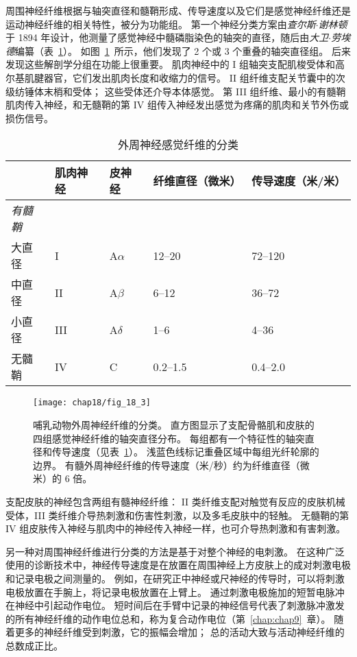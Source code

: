 周围神经纤维根据与轴突直径和髓鞘形成、传导速度以及它们是感觉神经纤维还是运动神经纤维的相关特性，被分为功能组。
第一个神经分类方案由\textit{查尔斯$\cdot$谢林顿}于 1894 年设计，他测量了感觉神经中髓磷脂染色的轴突的直径，随后由\textit{大卫$\cdot$劳埃德}编纂（表~\ref{tab:18_1}）。
如图~\ref{fig:18_3}~所示，他们发现了 2 个或 3 个重叠的轴突直径组。
后来发现这些解剖学分组在功能上很重要。
肌肉神经中的 I 组轴突支配肌梭受体和高尔基肌腱器官，它们发出肌肉长度和收缩力的信号。
II 组纤维支配关节囊中的次级纺锤体末梢和受体；
这些受体还介导本体感觉。
第 III 组纤维、最小的有髓鞘肌肉传入神经，和无髓鞘的第 IV 组传入神经发出感觉为疼痛的肌肉和关节外伤或损伤信号。


\begin{table}[htbp]
	\caption{外周神经感觉纤维的分类} \label{tab:18_1} \centering
	\begin{tabular}{lllll}
		\toprule
		 & 肌肉神经 & 皮神经 & 纤维直径（微米） & 传导速度（米/米）\\
		\midrule
		\textit{有髓鞘} &  &  & &  \\
		大直径 & I  & A$\alpha$ & 12–20 & 72–120 \\
		中直径 & II  & A$\beta$ & 6–12 & 36–72 \\
		小直径 & III  & A$\delta$ & 1–6 & 4–36 \\
		无髓鞘 & IV  & C & 0.2–1.5 & 0.4–2.0 \\
		\bottomrule
	\end{tabular}
\end{table}



\begin{figure}[htbp]
	\centering
	\texttt{[image: chap18/fig\_18\_3]}
	\caption{哺乳动物外周神经纤维的分类。
	直方图显示了支配骨骼肌和皮肤的四组感觉神经纤维的轴突直径分布。
	每组都有一个特征性的轴突直径和传导速度（见表~\ref{tab:18_1}）。
	浅蓝色线标记重叠区域中每组光纤轮廓的边界。
	有髓外周神经纤维的传导速度（米/秒）约为纤维直径（微米）的 6 倍。}
	\label{fig:18_3}
\end{figure}



支配皮肤的神经包含两组有髓神经纤维：
II 类纤维支配对触觉有反应的皮肤机械受体，III 类纤维介导热刺激和伤害性刺激，以及多毛皮肤中的轻触。
无髓鞘的第 IV 组皮肤传入神经与肌肉中的神经传入神经一样，也可介导热刺激和有害刺激。


另一种对周围神经纤维进行分类的方法是基于对整个神经的电刺激。
在这种广泛使用的诊断技术中，神经传导速度是在放置在周围神经上方皮肤上的成对刺激电极和记录电极之间测量的。
例如，在研究正中神经或尺神经的传导时，可以将刺激电极放置在手腕上，将记录电极放置在上臂上。
通过刺激电极施加的短暂电脉冲在神经中引起动作电位。
短时间后在手臂中记录的神经信号代表了刺激脉冲激发的所有神经纤维的动作电位总和，称为复合动作电位（第~\ref{chap:chap9}~章）。
随着更多的神经纤维受到刺激，它的振幅会增加；
总的活动大致与活动神经纤维的总数成正比。


